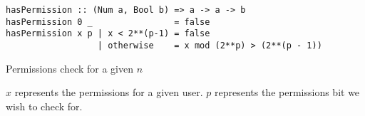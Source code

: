 \begin{listing}[H]
  \centering
  \begin{verbatim}
hasPermission :: (Num a, Bool b) => a -> a -> b
hasPermission 0 _                = false
hasPermission x p | x < 2**(p-1) = false
                  | otherwise    = x mod (2**p) > (2**(p - 1))
  \end{verbatim}
  \caption{
  	Permissions check for a given $n$
  }{
  	$x$ represents the permissions for a given user. $p$ represents the permissions bit we wish to check for.
  }
  \label{code:storage_permissions_check}
\end{listing}
